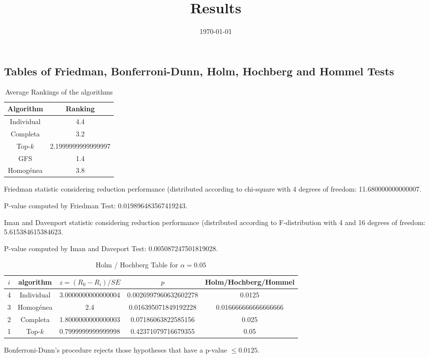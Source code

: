 \documentclass[a4paper,10pt]{article}
\title{Results}
\author{}
\date{\today}
\begin{document}
\begin{landscape}
\oddsidemargin 0in \topmargin 0in\maketitle
\section{Tables of Friedman, Bonferroni-Dunn, Holm, Hochberg and Hommel Tests}
\begin{table}[!htp]
\centering
\caption{Average Rankings of the algorithms
}\begin{tabular}{c|c}
Algorithm&Ranking\\
\hline
Individual&4.4\\
Completa&3.2\\
Top-$k$&2.1999999999999997\\
GFS&1.4\\
Homogénea&3.8\\
\end{tabular}
\end{table}


Friedman statistic considering reduction performance (distributed according to chi-square with 4 degrees of freedom: 11.680000000000007.


P-value computed by Friedman Test: 0.019896483567419243.\newline

Iman and Davenport statistic considering reduction performance (distributed according to F-distribution with 4 and 16 degrees of freedom: 5.615384615384623.


P-value computed by Iman and Daveport Test: 0.005087247501819028.\newline

\begin{table}[!htp]
\centering\tiny
\caption{Holm / Hochberg Table for $\alpha=0.05$}
\begin{tabular}{ccccc}
$i$&algorithm&$z=(R_0 - R_i)/SE$&$p$&Holm/Hochberg/Hommel\\
\hline
4&Individual&3.0000000000000004&0.0026997960632602278&0.0125\\
3&Homogénea&2.4&0.016395071849192228&0.016666666666666666\\
2&Completa&1.8000000000000003&0.07186063822585156&0.025\\
1&Top-$k$&0.7999999999999998&0.42371079716679355&0.05\\
\hline
\end{tabular}
\end{table}
Bonferroni-Dunn's procedure rejects those hypotheses that have a p-value $\le0.0125$.



\end{landscape}
\end{document}
